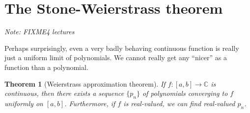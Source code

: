 \documentclass[12pt]{book}
\newcommand{\C}{{\mathbb{C}}}
\newcommand{\sectionnotes}[1]{\noindent \emph{Note: #1} \medskip \par}
\newcommand{\sectionnewpage}{\clearpage}
\theoremstyle{plain}
\newtheorem{thm}{Theorem}[section]
\theoremstyle{remark}
\theoremstyle{definition}
\theoremstyle{exercise}
\theoremstyle{example}
\begin{document}
\sectionnewpage
\section{The Stone-Weierstrass theorem}
\label{sec:FIXME}

\sectionnotes{FIXME4 lectures}

\medskip

Perhaps surprisingly, even a very badly behaving continuous function is really
just a uniform limit of polynomials.  We cannot really get any ``nicer'' as
a function than a polynomial.


\begin{thm}[Weierstrass approximation theorem]
If $f \colon [a,b] \to \C$ is continuous, then there exists a sequence $\{
p_n \}$ of polynomials converging to $f$ uniformly on $[a,b]$.
Furthermore, if $f$ is real-valued, we can find real-valued $p_n$.
\end{thm}

\end{document}
